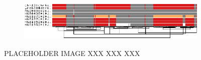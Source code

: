 \begin{figure}[ht!]
	\begin{subfigure}{\linewidth}
		\centering
		\includegraphics[width=1.0\linewidth, trim=-0cm 2cm 0 0cm]{fig/sorting/chr6_pan_fa_a2fb268_4030258_6a1ecc2_smooth_C4_bad_sorted}
		\label{fig:bad-sorting}
	\end{subfigure}
	\caption{
		PLACEHOLDER IMAGE
		XXX XXX XXX
	}
	\label{fig:sorting}
\end{figure}
